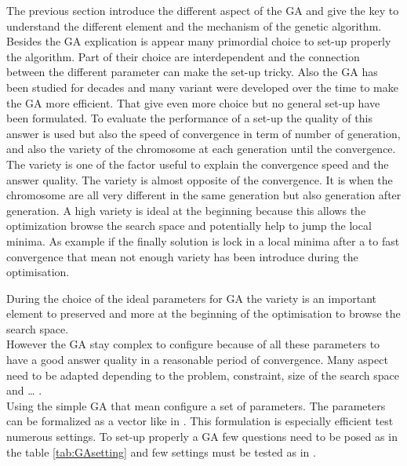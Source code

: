 The previous section introduce the different aspect of the GA and give the key to understand the different element and the mechanism of the genetic algorithm. Besides the GA explication is appear many primordial  choice  to set-up properly the algorithm. Part of their choice are interdependent and the connection between the different parameter can make the set-up tricky.
Also the GA has been studied for decades and many variant were developed over the time to make the GA more efficient. That give even more choice but no general set-up have been formulated.
To evaluate the  performance of a set-up the quality of this answer is used but also the speed of convergence in term of number of generation, and also the variety of the chromosome at each generation until the convergence. 
The variety is one of the factor useful to explain the convergence speed and the answer quality.
The variety is almost opposite of the convergence. It is when the chromosome  are all very different in the same generation but also generation after generation. A high variety is ideal at the beginning because this allows the optimization browse the search space and potentially help to jump the local minima. 
 As example if the finally solution is lock in a local minima after a to fast convergence that mean not enough variety has been introduce during the optimisation.

During the choice of the ideal parameters for GA the variety is an important element to preserved and more at the beginning of the optimisation to browse the search space.\\
 
However the GA stay complex to configure because of all these parameters to have a good answer quality in a reasonable period of convergence. Many aspect need to be adapted depending to the problem, constraint, size of the search space and … .  \\ 
Using the simple GA that mean configure a set of parameters. The parameters can be formalized as a vector like in \cite{71*grefenstette1986}. This formulation is especially  efficient test numerous settings. 
To set-up properly a GA few questions need to be posed as in the table \ref{tab:GAsetting} and few settings must be tested as in \cite{73*wright1991,71*grefenstette1986,133*schwefel1984}.

